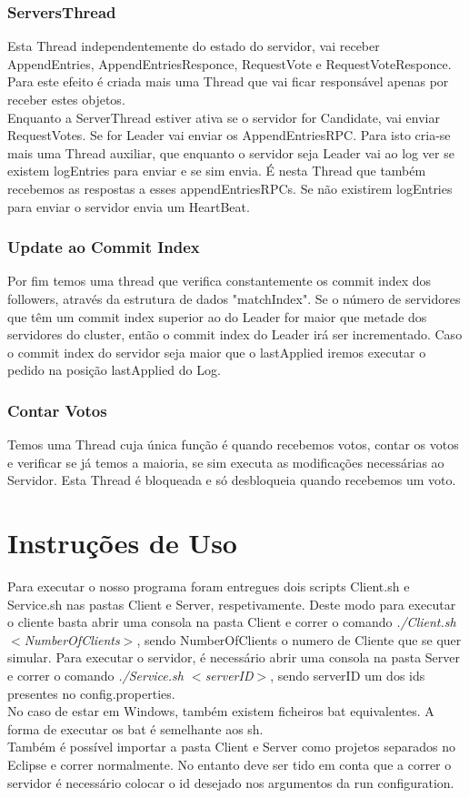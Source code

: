 \documentclass[12pt,a4paper]{report}
\begin{document}
\subsection{ServersThread}
Esta Thread independentemente do estado do servidor, vai receber AppendEntries, AppendEntriesResponce, RequestVote e RequestVoteResponce. Para este efeito é criada mais uma Thread que vai ficar responsável apenas por receber estes objetos.\\
Enquanto a ServerThread estiver ativa se o servidor for Candidate, vai enviar RequestVotes. Se for Leader vai enviar os AppendEntriesRPC. Para isto cria-se mais uma Thread auxiliar, que enquanto o servidor seja Leader vai ao log ver se existem logEntries para enviar e se sim envia. É nesta Thread que também recebemos as respostas a esses appendEntriesRPCs. Se não existirem logEntries para enviar o servidor envia um HeartBeat.

\subsection{Update ao Commit Index}
Por fim temos uma thread que verifica constantemente os commit index dos followers, através da estrutura de dados "matchIndex". Se o número de servidores que têm um commit index superior ao do Leader for maior que metade dos servidores do cluster, então o commit index do Leader irá ser incrementado. Caso o commit index do servidor  seja maior que o lastApplied iremos executar o pedido na posição lastApplied do Log.

\subsection{Contar Votos}
Temos uma Thread cuja única função é quando recebemos votos, contar os votos e verificar se já temos a maioria, se sim executa as modificações necessárias ao Servidor. Esta Thread é bloqueada e só desbloqueia quando recebemos um voto.

\chapter{Instruções de Uso}
Para executar o nosso programa foram entregues dois scripts Client.sh e Service.sh nas pastas Client e Server, respetivamente. Deste modo para executar o cliente basta abrir uma consola na pasta Client e correr o comando {\it ./Client.sh $<$NumberOfClients$>$}, sendo NumberOfClients o numero de Cliente que se quer simular. 
Para executar o servidor, é necessário abrir uma consola na pasta Server e correr o comando {\it ./Service.sh $<$serverID$>$}, sendo serverID um dos ids presentes no config.properties.
\\
No caso de estar em Windows, também existem ficheiros bat equivalentes. A forma de executar os bat é semelhante aos sh.
\\
Também é possível importar a pasta Client e Server como projetos separados no Eclipse e correr normalmente. No entanto deve ser tido em conta que a correr o servidor é necessário colocar o id desejado nos argumentos da run configuration.
\end{document}

